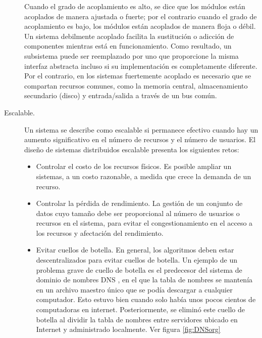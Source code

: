 \begin{description}
		 Cuando el grado de acoplamiento es alto, se dice que los módulos están acoplados de manera ajustada o fuerte; por el contrario cuando el grado de acoplamiento es bajo, los módulos están acoplados de manera floja o débil.
		Un sistema \gls{debilmente acoplado} facilita la sustitución o adicción de componentes  mientras  está en funcionamiento. Como resultado, un subsistema puede ser reemplazado por uno que proporcione la misma interfaz abstracta incluso si su implementación es completamente diferente. 		
		Por el contrario, en  los sistemas  \gls{fuertemente acoplado} es necesario que se compartan recursos comunes, como la memoria central, almacenamiento secundario (disco) y entrada/salida a través de un bus común. 
		
		
		
		
		\item[{Escalable.}]   Un sistema se describe como escalable  si permanece efectivo cuando hay un aumento significativo en el número de recursos y el número de usuarios. El diseño de sistemas distribuidos escalable presenta los siguientes retos:		
		\begin{itemize}			
			\item {Controlar el costo de los recursos físicos}.
			 Es posible ampliar un sistemas, a un costo razonable, a medida que crece la demanda de un recurso.
			
			\item {Controlar la pérdida de rendimiento}. 
			La gestión de un conjunto de datos cuyo tamaño debe ser proporcional al número de usuarios o recursos en el sistema, para evitar el congestionamiento en el acceso a los recursos y afectación del rendimiento.
			
			\item { Evitar cuellos de botella}.
			 En general, los algoritmos deben estar descentralizados para evitar cuellos de botella. Un ejemplo de un problema grave de cuello de botella es el  predecesor del sistema de dominio de nombres \gls{DNS} , en el que la tabla de nombres se mantenía en un archivo maestro único que se podía descargar a cualquier computador. Esto estuvo bien cuando solo había unos pocos cientos de computadoras en internet. Posteriormente,  se eliminó este cuello de botella al dividir la tabla de nombres entre servidores ubicado en Internet y administrado localmente. Ver figura \ref{fig:DNSorg} 
			

\end{itemize}
\end{description}
